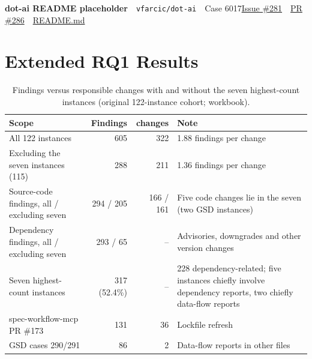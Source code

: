 \begin{casefile}{\textbf{dot-ai README placeholder}\ \ {\scriptsize\texttt{vfarcic/\allowbreak dot-ai}}\ \ {\scriptsize Case 6017}}{\href{https://github.com/vfarcic/dot-ai/issues/281}{Issue \#281}\ \ \href{https://github.com/vfarcic/dot-ai/pull/286}{PR \#286}\ \ \href{https://github.com/vfarcic/dot-ai/blob/466ccaa58eb1b86d2dab07089871102eeb497f49/examples/gateway-api/README.md}{README.md}}
\end{casefile}

\FloatBarrier
\section{Extended RQ1 Results}\label{sec:s4}

\begin{table}[H]
\caption{Findings versus responsible changes with and without the seven highest-count instances (original 122-instance cohort; workbook).}
\label{tab:concentration}
\footnotesize\renewcommand{\arraystretch}{1.12}
\begin{tabularx}{\linewidth}{@{}L{5.2cm}rrY@{}}
\toprule
\textbf{Scope} & \textbf{Findings} & \textbf{changes} & \textbf{Note}\\
\midrule
All 122 instances & 605 & 322 & 1.88 findings per change\\
Excluding the seven instances (115) & 288 & 211 & 1.36 findings per change\\
Source-code findings, all / excluding seven & 294 / 205 & 166 / 161 & Five code changes lie in the seven (two GSD instances)\\
Dependency findings, all / excluding seven & 293 / 65 & -- & Advisories, downgrades and other version changes\\
Seven highest-count instances & 317 (52.4\%) & -- & 228 dependency-related; five instances chiefly involve dependency reports, two chiefly data-flow reports\\
spec-workflow-mcp PR \#173 & 131 & 36 & Lockfile refresh\\
GSD cases 290/291 & 86 & 2 & Data-flow reports in other files\\
\bottomrule
\end{tabularx}
\end{table}


